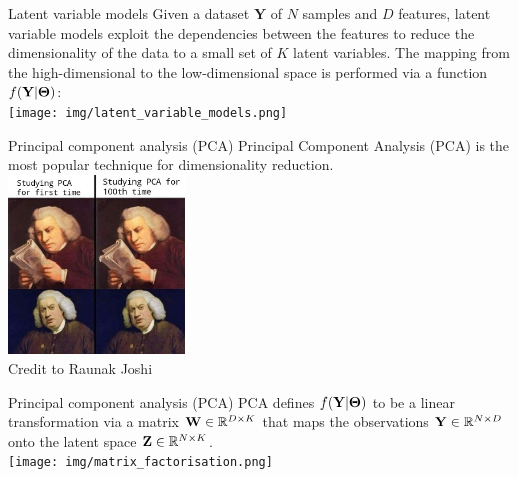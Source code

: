\documentclass[aspectratio=169,notes]{beamer}
\begin{document}

	\begin{frame}{Latent variable models}
	Given a dataset $\mathbf{Y}$ of $N$ samples and $D$ features, latent variable models exploit the dependencies between the features to reduce the dimensionality of the data to a small set of $K$ latent variables. The mapping from the high-dimensional to the low-dimensional space is performed via a function $f({\bf Y}|\mbox{\boldmath $\Theta$})$:\\
	\leavevmode\newline
	\centering
	\texttt{[image: img/latent\_variable\_models.png]}
	\end{frame}

	\begin{frame}{Principal component analysis (PCA)}
	Principal Component Analysis (PCA) is the most popular technique for dimensionality reduction.\\
	\leavevmode\newline
	\centering
	\includegraphics[height=4.75cm]{img/pca.jpeg}\\
  	\tiny Credit to Raunak Joshi \par
	\end{frame}


	\begin{frame}{Principal component analysis (PCA)}
	PCA defines $f({\bf Y}|\mbox{\boldmath $\Theta$})$ to be a linear transformation via a matrix ${\bf W} \in \mathbb{R}^{D \times K}$ that maps the observations ${\bf Y} \in \mathbb{R}^{N \times D}$ onto the latent space ${\bf Z} \in \mathbb{R}^{N \times K}$.\\
	\leavevmode\newline
	\centering
	\texttt{[image: img/matrix\_factorisation.png]}
	\end{frame}
\end{document}
